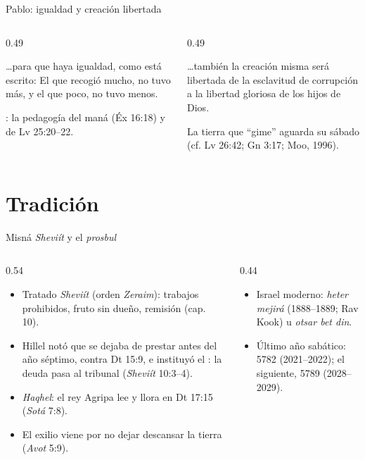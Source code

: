 \begin{frame}{Pablo: igualdad y creación libertada}
\begin{columns}[t,onlytextwidth]
\begin{column}{0.49\textwidth}
\begin{cita}\ldots{}para que haya igualdad, como está escrito: El que recogió mucho, no tuvo más, y el que poco, no tuvo menos.\end{cita}
\scriptsize {}: la pedagogía del maná (Éx 16:18) y de Lv 25:20--22.
\end{column}
\begin{column}{0.49\textwidth}
\begin{cita}\ldots{}también la creación misma será libertada de la esclavitud de corrupción a la libertad gloriosa de los hijos de Dios.\end{cita}
\scriptsize La tierra que ``gime'' aguarda su sábado (cf. Lv 26:42; Gn 3:17; Moo, 1996).
\end{column}
\end{columns}
\end{frame}

\section{Tradición}

\begin{frame}{Misná \emph{Sheviít} y el \emph{prosbul}}
\begin{columns}[c,onlytextwidth]
\begin{column}{0.54\textwidth}\small
\begin{itemize}
\item Tratado \emph{Sheviít} (orden \emph{Zeraim}): trabajos prohibidos, fruto sin dueño, remisión (cap. 10).
\item Hillel notó que se dejaba de prestar antes del año séptimo, contra Dt 15:9, e instituyó el : la deuda pasa al tribunal (\emph{Sheviít} 10:3--4).
\item \emph{Haqhel}: el rey Agripa lee y llora en Dt 17:15 (\emph{Sotá} 7:8).
\item El exilio viene por no dejar descansar la tierra (\emph{Avot} 5:9).
\end{itemize}
\end{column}
\begin{column}{0.44\textwidth}\small
\begin{itemize}
\item Israel moderno: \emph{heter mejirá} (1888--1889; Rav Kook) u \emph{otsar bet din}.
\item Último año sabático: 5782 (2021--2022); el siguiente, 5789 (2028--2029).
\end{itemize}
\end{column}
\end{columns}
\end{frame}

